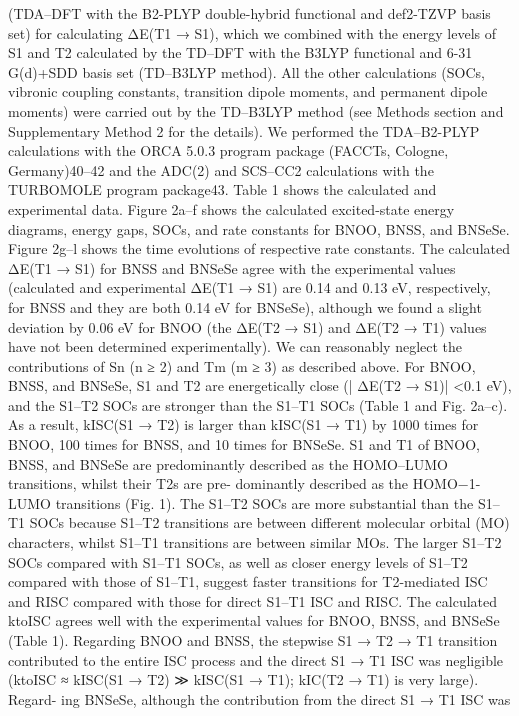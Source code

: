 (TDA–DFT with the B2-PLYP double-hybrid functional and def2-TZVP
basis set) for calculating ΔE(T1 → S1), which we combined with the
energy levels of S1 and T2 calculated by the TD–DFT with the B3LYP
functional and 6-31 G(d)+SDD basis set (TD–B3LYP method). All the
other calculations (SOCs, vibronic coupling constants, transition dipole
moments, and permanent dipole moments) were carried out by the
TD–B3LYP method (see Methods section and Supplementary Method 2
for the details). We performed the TDA–B2-PLYP calculations with the
ORCA 5.0.3 program package (FACCTs, Cologne, Germany)40–42 and the
ADC(2) and SCS–CC2 calculations with the TURBOMOLE program
package43. Table 1 shows the calculated and experimental data.
Figure 2a–f shows the calculated excited-state energy diagrams, energy
gaps, SOCs, and rate constants for BNOO, BNSS, and BNSeSe.
Figure 2g–l shows the time evolutions of respective rate constants. The
calculated ΔE(T1 → S1) for BNSS and BNSeSe agree with the experimental
values (calculated and experimental ΔE(T1 → S1) are 0.14 and 0.13 eV,
respectively, for BNSS and they are both 0.14 eV for BNSeSe), although
we found a slight deviation by 0.06 eV for BNOO (the ΔE(T2 → S1) and
ΔE(T2 → T1) values have not been determined experimentally). We can
reasonably neglect the contributions of Sn (n ≥ 2) and Tm (m ≥ 3) as
described above.
For BNOO, BNSS, and BNSeSe, S1 and T2 are energetically close (|
ΔE(T2 → S1)| <0.1 eV), and the S1–T2 SOCs are stronger than the S1–T1
SOCs (Table 1 and Fig. 2a–c). As a result, kISC(S1 → T2) is larger than
kISC(S1 → T1) by 1000 times for BNOO, 100 times for BNSS, and 10 times
for BNSeSe. S1 and T1 of BNOO, BNSS, and BNSeSe are predominantly
described as the HOMO–LUMO transitions, whilst their T2s are pre-
dominantly described as the HOMO−1-LUMO transitions (Fig. 1). The
S1–T2 SOCs are more substantial than the S1–T1 SOCs because S1–T2
transitions are between different molecular orbital (MO) characters,
whilst S1–T1 transitions are between similar MOs.
The larger S1–T2 SOCs compared with S1–T1 SOCs, as well as closer
energy levels of S1–T2 compared with those of S1–T1, suggest faster
transitions for T2-mediated ISC and RISC compared with those for
direct S1–T1 ISC and RISC. The calculated ktoISC agrees well with the
experimental values for BNOO, BNSS, and BNSeSe (Table 1). Regarding
BNOO and BNSS, the stepwise S1 → T2 → T1 transition contributed to the
entire ISC
process
and
the
direct S1 → T1
ISC
was negligible
(ktoISC ≈ kISC(S1 → T2) ≫ kISC(S1 → T1); kIC(T2 → T1) is very large). Regard-
ing BNSeSe, although the contribution from the direct S1 → T1 ISC was

